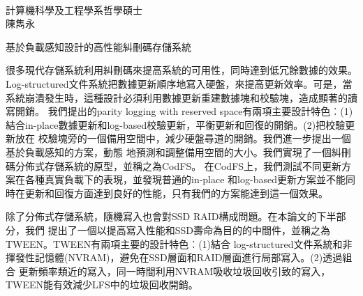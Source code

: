 \\
計算機科學及工程學系哲學碩士\\
陳雋永

\noindent 基於負載感知設計的高性能糾刪碼存儲系統

\vspace{1cm}

很多現代存儲系統利用糾刪碼來提高系統的可用性，同時達到低冗餘數據的效果。
Log-structured文件系統把數據更新順序地寫入硬盤，來提高更新效率。可是，當
系統崩潰發生時，這種設計必須利用數據更新重建數據塊和校驗塊，造成顯著的讀寫開銷。
我們提出的parity logging with reserved space有兩項主要設計特色︰(1)
結合in-place數據更新和log-based校驗更新，平衡更新和回復的開銷。(2)把校驗更新放在
校驗塊旁的一個備用空間中，減少硬盤尋道的開銷。我們進一步提出一個基於負載感知的方案，動態
地預測和調整備用空間的大小。我們實現了一個糾刪碼分佈式存儲系統的原型，並稱之為CodFS。
在CodFS上，我們測試不同更新方案在各種真實負載下的表現，並發現普通的in-place
和log-based更新方案並不能同時在更新和回復方面達到良好的性能，只有我們的方案能達到這一個效果。

除了分佈式存儲系統，隨機寫入也會對SSD RAID構成問題。在本論文的下半部分，我們
提出了一個以提高寫入性能和SSD壽命為目的的中間件，並稱之為TWEEN。TWEEN有兩項主要的設計特色︰(1)結合
log-structured文件系統和非揮發性記憶體(NVRAM)，避免在SSD層面和RAID層面進行局部寫入。(2)透過組合
更新頻率類近的寫入，同一時間利用NVRAM吸收垃圾回收引致的寫入，TWEEN能有效減少LFS中的垃圾回收開銷。
